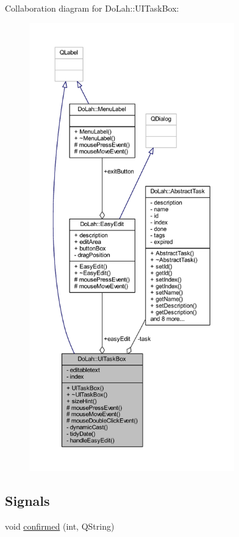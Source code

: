 Collaboration diagram for Do\+Lah\+:\+:U\+I\+Task\+Box\+:
\nopagebreak
\begin{figure}[H]
\begin{center}
\leavevmode
\includegraphics[height=550pt]{class_do_lah_1_1_u_i_task_box__coll__graph}
\end{center}
\end{figure}
\subsection*{Signals}
\begin{DoxyCompactItemize}
\item 
void \hyperlink{class_do_lah_1_1_u_i_task_box_aeec8072f6c9947b54273bcc5a079a4f3}{confirmed} (int, Q\+String)
\end{DoxyCompactItemize}
